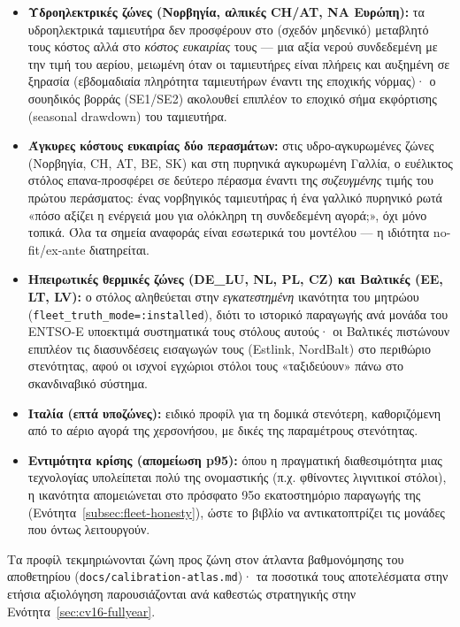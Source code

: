 \begin{itemize}
\item \textbf{Υδροηλεκτρικές ζώνες (Νορβηγία, αλπικές CH/AT, ΝΑ Ευρώπη):} τα υδροηλεκτρικά ταμιευτήρα δεν προσφέρουν στο (σχεδόν μηδενικό) μεταβλητό τους κόστος αλλά στο \emph{κόστος ευκαιρίας} τους --- μια αξία νερού συνδεδεμένη με την τιμή του αερίου, μειωμένη όταν οι ταμιευτήρες είναι πλήρεις και αυξημένη σε ξηρασία (εβδομαδιαία πληρότητα ταμιευτήρων έναντι της εποχικής νόρμας)· ο σουηδικός βορράς (SE1/SE2) ακολουθεί επιπλέον το εποχικό σήμα εκφόρτισης (seasonal drawdown) του ταμιευτήρα.
\item \textbf{Άγκυρες κόστους ευκαιρίας δύο περασμάτων:} στις υδρο-αγκυρωμένες ζώνες (Νορβηγία, CH, AT, BE, SK) και στη πυρηνικά αγκυρωμένη Γαλλία, ο ευέλικτος στόλος επανα-προσφέρει σε δεύτερο πέρασμα έναντι της \emph{συζευγμένης} τιμής του πρώτου περάσματος: ένας νορβηγικός ταμιευτήρας ή ένα γαλλικό πυρηνικό ρωτά «πόσο αξίζει η ενέργειά μου για ολόκληρη τη συνδεδεμένη αγορά;», όχι μόνο τοπικά. Όλα τα σημεία αναφοράς είναι εσωτερικά του μοντέλου --- η ιδιότητα no-fit/ex-ante διατηρείται.
\item \textbf{Ηπειρωτικές θερμικές ζώνες (DE\_LU, NL, PL, CZ) και Βαλτικές (EE, LT, LV):} ο στόλος αληθεύεται στην \emph{εγκατεστημένη} ικανότητα του μητρώου (\texttt{fleet\_truth\_mode=:installed}), διότι το ιστορικό παραγωγής ανά μονάδα του ENTSO-E υποεκτιμά συστηματικά τους στόλους αυτούς· οι Βαλτικές πιστώνουν επιπλέον τις διασυνδέσεις εισαγωγών τους (Estlink, NordBalt) στο περιθώριο στενότητας, αφού οι ισχνοί εγχώριοι στόλοι τους «ταξιδεύουν» πάνω στο σκανδιναβικό σύστημα.
\item \textbf{Ιταλία (επτά υποζώνες):} ειδικό προφίλ για τη δομικά στενότερη, καθοριζόμενη από το αέριο αγορά της χερσονήσου, με δικές της παραμέτρους στενότητας.
\item \textbf{Εντιμότητα κρίσης (απομείωση p95):} όπου η πραγματική διαθεσιμότητα μιας τεχνολογίας υπολείπεται πολύ της ονομαστικής (π.χ. φθίνοντες λιγνιτικοί στόλοι), η ικανότητα απομειώνεται στο πρόσφατο 95ο εκατοστημόριο παραγωγής της (Ενότητα~\ref{subsec:fleet-honesty}), ώστε το βιβλίο να αντικατοπτρίζει τις μονάδες που όντως λειτουργούν.
\end{itemize}

Τα προφίλ τεκμηριώνονται ζώνη προς ζώνη στον άτλαντα βαθμονόμησης του αποθετηρίου (\texttt{docs/calibration-atlas.md})· τα ποσοτικά τους αποτελέσματα στην ετήσια αξιολόγηση παρουσιάζονται ανά καθεστώς στρατηγικής στην Ενότητα~\ref{sec:cv16-fullyear}.


